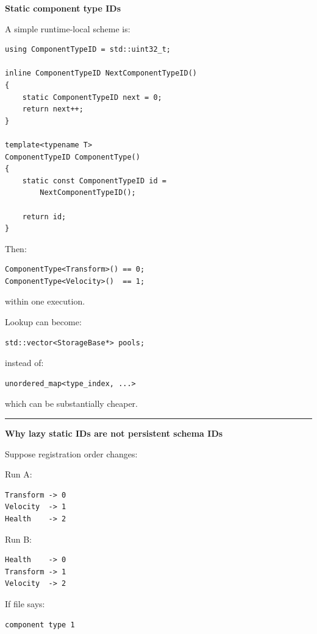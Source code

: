 \textbf{Static component type IDs}

A simple runtime-local scheme is:

\begin{verbatim}
using ComponentTypeID = std::uint32_t;

inline ComponentTypeID NextComponentTypeID()
{
    static ComponentTypeID next = 0;
    return next++;
}

template<typename T>
ComponentTypeID ComponentType()
{
    static const ComponentTypeID id =
        NextComponentTypeID();

    return id;
}
\end{verbatim}

Then:

\begin{verbatim}
ComponentType<Transform>() == 0;
ComponentType<Velocity>()  == 1;
\end{verbatim}

within one execution.

Lookup can become:

\begin{verbatim}
std::vector<StorageBase*> pools;
\end{verbatim}

instead of:

\begin{verbatim}
unordered_map<type_index, ...>
\end{verbatim}

which can be substantially cheaper.

\begin{center}\rule{0.5\linewidth}{0.5pt}\end{center}

\textbf{Why lazy static IDs are not persistent schema IDs}

Suppose registration order changes:

Run A:

\begin{verbatim}
Transform -> 0
Velocity  -> 1
Health    -> 2
\end{verbatim}

Run B:

\begin{verbatim}
Health    -> 0
Transform -> 1
Velocity  -> 2
\end{verbatim}

If file says:

\begin{verbatim}
component type 1
\end{verbatim}

